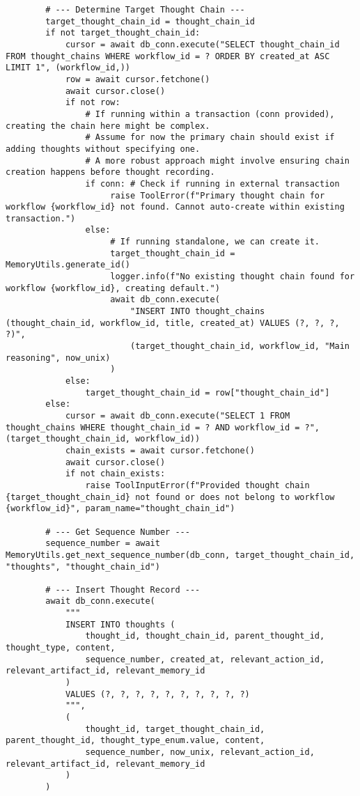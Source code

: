 \documentclass[12pt,a4paper]{article}
\begin{document}
\begin{pageablecode}
\begin{verbatim}
        # --- Determine Target Thought Chain ---
        target_thought_chain_id = thought_chain_id
        if not target_thought_chain_id:
            cursor = await db_conn.execute("SELECT thought_chain_id FROM thought_chains WHERE workflow_id = ? ORDER BY created_at ASC LIMIT 1", (workflow_id,))
            row = await cursor.fetchone()
            await cursor.close()
            if not row:
                # If running within a transaction (conn provided), creating the chain here might be complex.
                # Assume for now the primary chain should exist if adding thoughts without specifying one.
                # A more robust approach might involve ensuring chain creation happens before thought recording.
                if conn: # Check if running in external transaction
                     raise ToolError(f"Primary thought chain for workflow {workflow_id} not found. Cannot auto-create within existing transaction.")
                else:
                     # If running standalone, we can create it.
                     target_thought_chain_id = MemoryUtils.generate_id()
                     logger.info(f"No existing thought chain found for workflow {workflow_id}, creating default.")
                     await db_conn.execute(
                         "INSERT INTO thought_chains (thought_chain_id, workflow_id, title, created_at) VALUES (?, ?, ?, ?)",
                         (target_thought_chain_id, workflow_id, "Main reasoning", now_unix)
                     )
            else:
                target_thought_chain_id = row["thought_chain_id"]
        else:
            cursor = await db_conn.execute("SELECT 1 FROM thought_chains WHERE thought_chain_id = ? AND workflow_id = ?", (target_thought_chain_id, workflow_id))
            chain_exists = await cursor.fetchone()
            await cursor.close()
            if not chain_exists:
                raise ToolInputError(f"Provided thought chain {target_thought_chain_id} not found or does not belong to workflow {workflow_id}", param_name="thought_chain_id")

        # --- Get Sequence Number ---
        sequence_number = await MemoryUtils.get_next_sequence_number(db_conn, target_thought_chain_id, "thoughts", "thought_chain_id")

        # --- Insert Thought Record ---
        await db_conn.execute(
            """
            INSERT INTO thoughts (
                thought_id, thought_chain_id, parent_thought_id, thought_type, content,
                sequence_number, created_at, relevant_action_id, relevant_artifact_id, relevant_memory_id
            )
            VALUES (?, ?, ?, ?, ?, ?, ?, ?, ?, ?)
            """,
            (
                thought_id, target_thought_chain_id, parent_thought_id, thought_type_enum.value, content,
                sequence_number, now_unix, relevant_action_id, relevant_artifact_id, relevant_memory_id
            )
        )


\end{verbatim}
\end{pageablecode}
\end{document}
